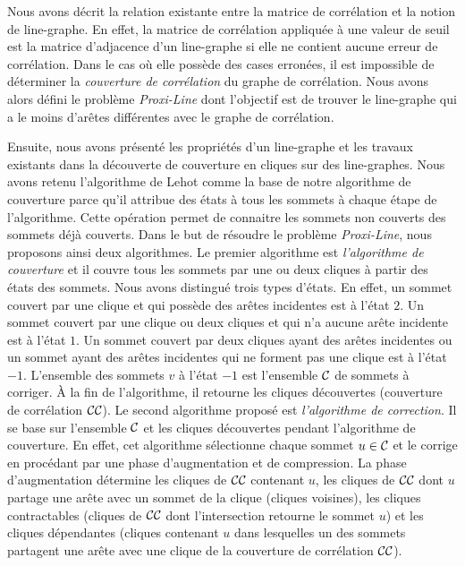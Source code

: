 Nous avons d\'ecrit la relation existante entre la matrice de corr\'elation et la notion de line-graphe. En effet, la matrice de corr\'elation appliqu\'ee \`a une valeur de seuil est la matrice d'adjacence d'un line-graphe si elle ne contient aucune erreur de corr\'elation.  Dans le cas o\`u elle poss\`ede des cases erron\'ees, il est impossible de d\'eterminer la {\em couverture de corr\'elation} du graphe de corr\'elation. Nous avons alors d\'efini le probl\`eme {\em Proxi-Line} dont l'objectif est de trouver le line-graphe  qui a le moins d'ar\^etes diff\'erentes avec le graphe de corr\'elation.  
\newline

Ensuite, nous avons pr\'esent\'e les propri\'et\'es d'un line-graphe et les travaux existants dans la d\'ecouverte de couverture en cliques sur des line-graphes. Nous avons retenu l'algorithme de Lehot \cite{decompositionEnCliques} comme la base de notre algorithme de couverture parce qu'il attribue  des \'etats \`a tous les sommets \`a chaque \'etape de l'algorithme. Cette op\'eration permet de connaitre les sommets non couverts des sommets d\'ej\`a couverts. 
\newline
Dans le but de r\'esoudre le probl\`eme {\em Proxi-Line}, nous proposons ainsi deux algorithmes. 
\newline
Le premier algorithme est {\em l'algorithme de couverture} et il couvre tous les sommets par une ou deux cliques \`a partir des \'etats des sommets. Nous avons distingu\'e trois types d'\'etats.
En effet, un sommet couvert par une clique et qui poss\`ede des ar\^etes incidentes est \`a l'\'etat  $2$. Un sommet couvert par une clique ou deux cliques et qui n'a aucune ar\^ete incidente est \`a l'\'etat $1$. Un sommet couvert par deux cliques ayant des ar\^etes incidentes ou un sommet ayant des ar\^etes incidentes qui ne forment pas une clique est \`a l'\'etat $-1$. 
L'ensemble des sommets $v$ \`a l'\'etat $-1$ est l'ensemble $\cal C$ de sommets \`a corriger. \`A la fin de l'algorithme, il retourne les cliques d\'ecouvertes (couverture de corr\'elation $\cal CC$). 
\newline
Le second algorithme propos\'e est {\em l'algorithme de correction}. Il se base sur l'ensemble $\cal C$ et les cliques d\'ecouvertes pendant l'algorithme de couverture. 
En effet, cet algorithme s\'electionne chaque sommet $u \in \cal C$ et le corrige en proc\'edant par une phase d'augmentation et de compression.
La phase d'augmentation d\'etermine les cliques de $\cal CC$ contenant $u$, les cliques de $\cal CC$  dont $u$ partage une ar\^ete avec un sommet de la clique (cliques voisines), les cliques contractables (cliques de $\cal CC$ dont l'intersection retourne le sommet $u$) et les cliques d\'ependantes (cliques contenant $u$ dans lesquelles un des sommets partagent une ar\^ete avec une clique de la couverture  de corr\'elation $\cal CC$). 

